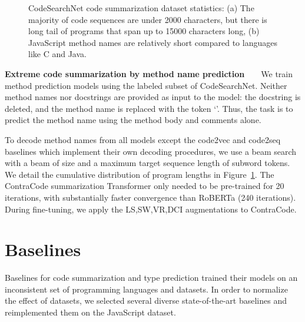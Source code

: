 \documentclass[11pt]{article}
\newcommand{\thou}[0]{}
\newcommand{\ours}[0]{ContraCode}
\begin{document}
\begin{figure}[t!]
    \centering
    \qquad
    \caption{CodeSearchNet code summarization dataset statistics: (a) The majority of code sequences are under 2000 characters, but there is long tail of programs that span up to 15000 characters long, (b) JavaScript method names are relatively short compared to languages like C and Java.}
    \label{fig:dataset_statistics_identifier}
\end{figure} 
\textbf{Extreme code summarization by method name prediction}~~~~We train method prediction models using the labeled subset of CodeSearchNet. Neither method names nor docstrings are provided as input to the model: the docstring is deleted, and the method name is replaced with the token `'. Thus, the task is to predict the method name using the method body and comments alone.

To decode method names from all models except the code2vec and code2seq baselines which implement their own decoding procedures, we use a beam search with a beam of size  and a maximum target sequence length of  subword tokens. We detail the cumulative distribution of program lengths in Figure~\ref{fig:dataset_statistics_identifier}. The \ours{} summarization Transformer only needed to be pre-trained for 20\thou{} iterations, with substantially faster convergence than RoBERTa (240\thou{} iterations). During fine-tuning, we apply the LS,SW,VR,DCI augmentations to \ours{}.



\section{Baselines}
\label{sec:appendix:baseline_js}
Baselines for code summarization and type prediction trained their models on an inconsistent set of programming languages and datasets. In order to normalize the effect of datasets, we selected several diverse state-of-the-art baselines and reimplemented them on the JavaScript dataset.
\end{document}
